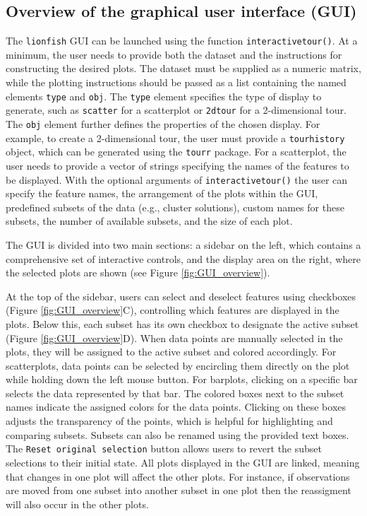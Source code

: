 \documentclass[article]{ajs}
\begin{document}
\subsection{Overview of the graphical user interface (GUI)}

The \texttt{lionfish} GUI can be launched using the function \texttt{interactive\textunderscore tour()}. At a minimum, the user needs to provide both the dataset and the instructions for constructing the desired plots. The dataset must be supplied as a numeric matrix, while the plotting instructions should be passed as a list containing the named elements \texttt{type} and \texttt{obj}. The \texttt{type} element specifies the type of display to generate, such as \texttt{scatter} for a scatterplot or \texttt{2d\textunderscore tour} for a 2-dimensional tour. The \texttt{obj} element further defines the properties of the chosen display. For example, to create a 2-dimensional tour, the user must provide a \texttt{tour\textunderscore history} object, which can be generated using the \texttt{tourr} package. For a scatterplot, the user needs to provide a vector of strings specifying the names of the features to be displayed. With the optional arguments of \texttt{interactive\textunderscore tour()} the user can specify the feature names, the arrangement of the plots within the GUI, predefined subsets of the data (e.g., cluster solutions), custom names for these subsets, the number of available subsets, and the size of each plot.

The GUI is divided into two main sections: a sidebar on the left, which contains a comprehensive set of interactive controls, and the display area on the right, where the selected plots are shown (see Figure \ref{fig:GUI_overview}).

At the top of the sidebar, users can select and deselect features using checkboxes (Figure \ref{fig:GUI_overview}C), controlling which features are displayed in the plots. Below this, each subset has its own checkbox to designate the active subset (Figure \ref{fig:GUI_overview}D). When data points are manually selected in the plots, they will be assigned to the active subset and colored accordingly. For scatterplots, data points can be selected by encircling them directly on the plot while holding down the left mouse button. For barplots, clicking on a specific bar selects the data represented by that bar. The colored boxes next to the subset names indicate the assigned colors for the data points. Clicking on these boxes adjusts the transparency of the points, which is helpful for highlighting and comparing subsets. Subsets can also be renamed using the provided text boxes. The \texttt{Reset original selection} button allows users to revert the subset selections to their initial state. All plots displayed in the GUI are linked, meaning that changes in one plot will affect the other plots. For instance, if observations are moved from one subset into another subset in one plot then the reassigment will also occur in the other plots. 
\end{document}
